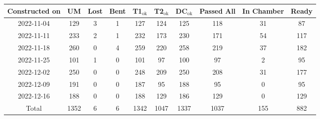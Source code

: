 \begin{tabular}{|c|c|c|c|c|c|c|c|c|c|}
\hline
Constructed on &   UM &  Lost &  Bent &  T1$_\text{ok}$ &  T2$_\text{ok}$ &  DC$_\text{ok}$ &  Passed All &  In Chamber &  Ready \\\hline

    2022-11-04 &  129 &     3 &     1 &             127 &             124 &             125 &         118 &          31 &     87 \\\hline
    2022-11-11 &  233 &     2 &     1 &             232 &             173 &             230 &         171 &          54 &    117 \\\hline
    2022-11-18 &  260 &     0 &     4 &             259 &             220 &             258 &         219 &          37 &    182 \\\hline
    2022-11-25 &  101 &     1 &     0 &             101 &              97 &             100 &          97 &           2 &     95 \\\hline
    2022-12-02 &  250 &     0 &     0 &             248 &             209 &             250 &         208 &          31 &    177 \\\hline
    2022-12-09 &  191 &     0 &     0 &             187 &              95 &             188 &          95 &           0 &     95 \\\hline
    2022-12-16 &  188 &     0 &     0 &             188 &             129 &             186 &         129 &           0 &    129 \\\hline
         Total & 1352 &     6 &     6 &            1342 &            1047 &            1337 &        1037 &         155 &    882 \\\hline

\end{tabular}
